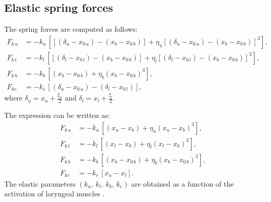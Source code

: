 \documentclass[a4paper,10pt]{article}
\begin{document}
\subsection{Elastic spring forces}
The spring forces are computed as follows:
\begin{equation} \label{Eq_S1s1_01}
  \begin{aligned}
    F_{k\,u} & = -k_{u} \, \left[ \left[ (\delta_{u} - x_{0\,u}) - (x_{b} - x_{0\,b}) \right] +
                \eta_{u} \left[ (\delta_{u} - x_{0\,u}) - (x_{b} - x_{0\,b}) \right]^3 \right], \\
    F_{k\,l} & = -k_{l} \, \left[ \left[ (\delta_{l} - x_{0\,l}) - (x_{b} - x_{0\,b}) \right] +
                \eta_{l} \left[ (\delta_{l} - x_{0\,l}) - (x_{b} - x_{0\,b}) \right]^3 \right], \\
    F_{k\,b} & = -k_{b} \, \left[ \left(x_{b} - x_{0\,b} \right) +
                \eta_{b} \left(x_{b} - x_{0\,b} \right)^3 \right], \\
    F_{kc} & = -k_{c} \, \left[ (\delta_{u} - x_{0\,u}) - (\delta_{l} - x_{0\,l}) \right],
  \end{aligned}
\end{equation}
where $\delta_{u} = x_{u} + \frac{\xi_{u}}{2}$ and $\delta_{l} = x_{l} + \frac{\xi_{l}}{2}$.

The expression can be written as:
\begin{equation} \label{Eq_S1s1_02}
  \begin{aligned}
    F_{k\,u} & = -k_{u} \, \left[ \left( x_{u} - x_{b} \right) +
                \eta_{u} \left( x_{u} - x_{b} \right)^3 \right], \\
    F_{k\,l} & = -k_{l} \, \left[ \left( x_{l} - x_{b} \right) +
                \eta_{l} \left( x_{l} - x_{b} \right)^3 \right], \\
    F_{k\,b} & = -k_{b} \, \left[ \left(x_{b} - x_{0\,b} \right) +
                \eta_{b} \left(x_{b} - x_{0\,b} \right)^3 \right], \\
    F_{kc} & = -k_{c} \, \left[ x_{u} - x_{l} \right].
  \end{aligned}
\end{equation}
The elastic parameters $(k_{u}, \, k_{l}, \, k_{b}, \, k_{c})$ are obtained as a function
of the activation of laryngeal muscles \cite{titze_rules_2002}.
\end{document}
